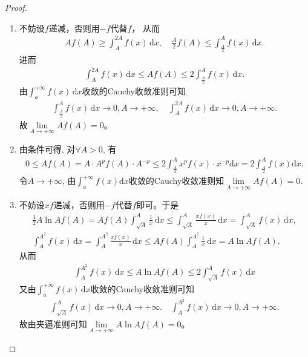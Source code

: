 \documentclass[../../main.tex]{subfiles}%
\begin{document}
\begin{proof}
\begin{enumerate}[(1)]
\item 不妨设\(f\)递减，否则用\(-f\)代替\(f\)，
从而
\begin{align*}
Af(A)\geqslant \int_A^{2A}{f(x)\,\mathrm{d}x},\quad \frac{A}{2}f(A)\leqslant \int_{\frac{A}{2}}^A{f(x)\,\mathrm{d}x.}
\end{align*}
进而
\begin{align*}
\int_A^{2A}{f(x)\,\mathrm{d}x}\leqslant Af(A)\leqslant 2\int_{\frac{A}{2}}^A{f(x)\,\mathrm{d}x}.
\end{align*}
由\(\int_a^{+\infty}{f(x)\,\mathrm{d}x}\)收敛的Cauchy收敛准则可知
\begin{align*}
\int_{\frac{A}{2}}^A{f(x)\,\mathrm{d}x}\rightarrow 0, A\rightarrow +\infty,  \quad
\int_A^{2A}{f(x)\,\mathrm{d}x}\rightarrow 0, A\rightarrow +\infty.
\end{align*}
故\(\lim\limits_{A\rightarrow+\infty}Af(A)=0\)。

\item 由条件可得, 对$\forall A>0$, 有
\begin{align*}
0\leqslant Af\left( A \right) =A\cdot A^pf\left( A \right) \cdot A^{-p}\leqslant 2\int_{\frac{A}{2}}^A{x^pf\left( x \right) \cdot x^{-p}\mathrm{d}x}=2\int_{\frac{A}{2}}^A{f\left( x \right) \mathrm{d}x}.
\end{align*}
令$A\rightarrow +\infty$, 由$\int_a^{+\infty}{f\left( x \right) \mathrm{d}x}$收敛的Cauchy收敛准则知$\lim\limits_{A\rightarrow +\infty}{Af\left( A \right)} =0$.

\item 不妨设\(xf\)递减，否则用\(-f\)代替\(f\)即可。于是
\begin{align*}
\frac{1}{2}A\ln A f(A) = Af(A)\int_{\sqrt{A}}^A\frac{1}{x}\,\mathrm{d}x 
\leqslant  \int_{\sqrt{A}}^A\frac{xf(x)}{x}\,\mathrm{d}x 
= \int_{\sqrt{A}}^A f(x)\,\mathrm{d}x,
\\ 
\int_A^{A^2} f(x)\,\mathrm{d}x = \int_A^{A^2}\frac{xf(x)}{x}\,\mathrm{d}x 
\leqslant  Af(A)\int_A^{A^2}\frac{1}{x}\,\mathrm{d}x 
= A\ln A f(A).
\end{align*}
从而
\begin{align*}
\int_A^{A^2} f(x)\,\mathrm{d}x \leqslant  A\ln A f(A) 
\leqslant  2\int_{\sqrt{A}}^A f(x)\,\mathrm{d}x
\end{align*}
又由\(\int_a^{+\infty} f(x)\,\mathrm{d}x\)收敛的Cauchy收敛准则可知
\begin{align*}
\int_{\sqrt{A}}^A f(x)\,\mathrm{d}x \to 0, A \to +\infty. \quad
\int_A^{A^2} f(x)\,\mathrm{d}x \to 0,  A \to +\infty.
\end{align*}
故由夹逼准则可知\(\lim\limits_{A \to +\infty}A\ln A f(A)=0\)。 
\end{enumerate}
\end{proof}
\end{document}
